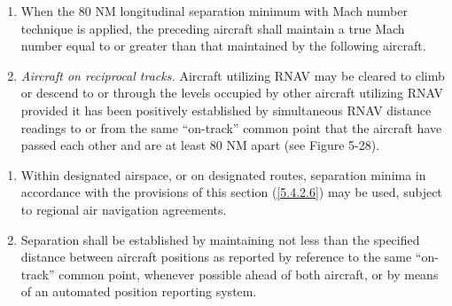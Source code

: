 \begin{enumeratesc}
\begin{enumerate}
        \item When the 80 NM longitudinal separation minimum with Mach number technique is applied, the preceding aircraft shall maintain a true Mach number equal to or greater than that maintained by the following aircraft.
        \item \textit{Aircraft on reciprocal tracks.} Aircraft utilizing RNAV may be cleared to climb or descend to or through the levels occupied by other aircraft utilizing RNAV provided it has been positively established by simultaneous RNAV distance readings to or from the same “on-track” common point that the aircraft have passed each other and are at least 80 NM apart (see Figure 5-28).
    \end{enumerate}


     \label{5.4.2.6}
    \begin{enumerate}
        \item Within designated airspace, or on designated routes, separation minima in accordance with the provisions of this section (\ref{5.4.2.6}) may be used, subject to regional air navigation agreements.
        \item Separation shall be established by maintaining not less than the specified distance between aircraft positions as reported by reference to the same “on-track” common point, whenever possible ahead of both aircraft, or by means of an automated position reporting system.


\end{enumerate}
\end{enumeratesc}

